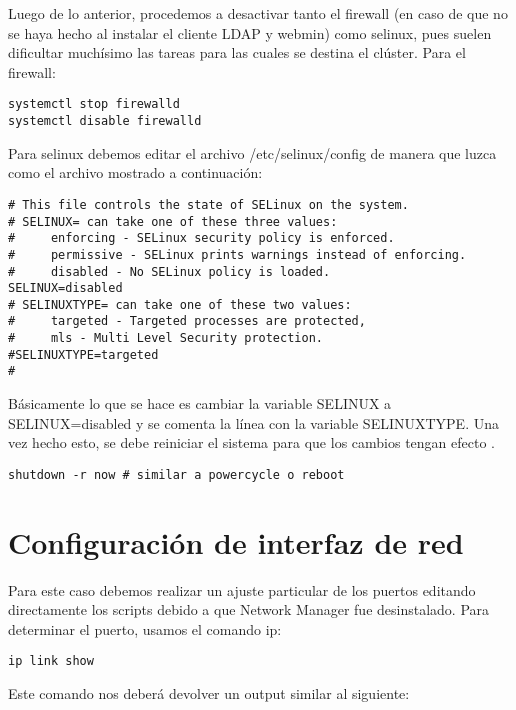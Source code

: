 Luego de lo anterior, procedemos a desactivar tanto el firewall (en caso de que no se haya hecho al instalar el cliente LDAP y webmin) como selinux, pues suelen dificultar muchísimo las tareas para las cuales se destina el clúster. Para el firewall:

\begin{lstlisting} 
systemctl stop firewalld
systemctl disable firewalld
\end{lstlisting}

Para selinux debemos editar el archivo /etc/selinux/config de manera que luzca como el archivo mostrado a continuación:

\begin{lstlisting} 
# This file controls the state of SELinux on the system.
# SELINUX= can take one of these three values:
#     enforcing - SELinux security policy is enforced.
#     permissive - SELinux prints warnings instead of enforcing.
#     disabled - No SELinux policy is loaded.
SELINUX=disabled
# SELINUXTYPE= can take one of these two values:
#     targeted - Targeted processes are protected,
#     mls - Multi Level Security protection.
#SELINUXTYPE=targeted 
#
\end{lstlisting}
Básicamente lo que se hace es cambiar la variable SELINUX a SELINUX=disabled y se comenta la línea con la variable SELINUXTYPE. Una vez hecho esto, se debe reiniciar el sistema para que los cambios tengan efecto \cite{selinuxdis}.

\begin{lstlisting} 
shutdown -r now # similar a powercycle o reboot
\end{lstlisting}

\section{Configuración de interfaz de red}

Para este caso debemos realizar un ajuste particular de los puertos editando directamente los scripts debido a que Network Manager fue desinstalado. Para determinar el puerto, usamos el comando ip:

\begin{lstlisting} 
ip link show
\end{lstlisting}

Este comando nos deberá devolver un output similar al siguiente:

